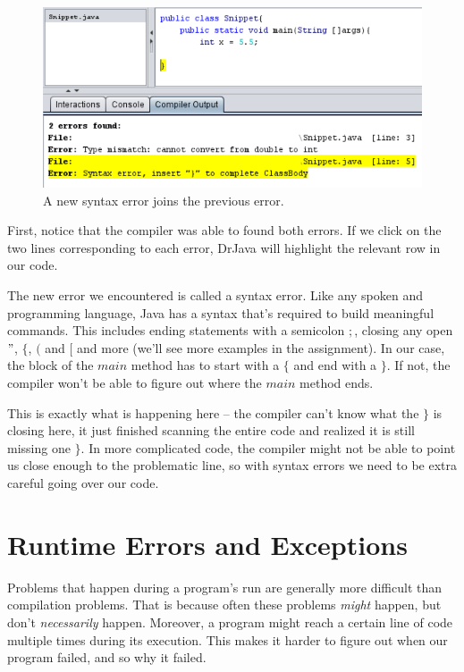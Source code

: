 \begin{figure}[h!]
\centering
\includegraphics[scale=0.8]{lectures/images/syntax_error.PNG}
\caption{A new syntax error joins the previous error.}
\label{fig:syntax_error}
\end{figure}

First, notice that the compiler was able to found both errors. If we click on the two lines corresponding to each error, DrJava will highlight the relevant row in our code. 

The new error we encountered is called a syntax error. Like any spoken and programming language, Java has a syntax that's required to build meaningful commands. This includes ending statements with a semicolon $;$, closing any open $"$, $\{$, $($ and $[$ and more (we'll see more examples in the assignment). In our case, the block of the $main$ method has to start with a $\{$ and end with a $\}$. If not, the compiler won't be able to figure out where the $main$ method ends.

This is exactly what is happening here -- the compiler can't know what the $\}$ is closing here, it just finished scanning the entire code and realized it is still missing one $\}$. In more complicated code, the compiler might not be able to point us close enough to the problematic line, so with syntax errors we need to be extra careful going over our code.

\section{Runtime Errors and Exceptions}

Problems that happen during a program's run are generally more difficult than compilation problems. That is because often these problems \emph{might} happen, but don't \emph{necessarily} happen. Moreover, a program might reach a certain line of code multiple times during its execution. This makes it harder to figure out when our program failed, and so why it failed.

